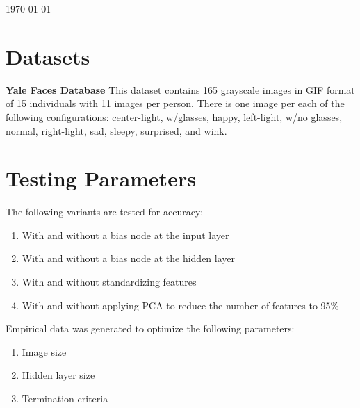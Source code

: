 \documentclass[12pt]{article}
\begin{document}
\begin{titlepage}

{\large \today}\\[3cm] %




\vfill %
\end{titlepage}

\newpage

\section{Datasets}
\textbf{Yale Faces Database} \quad This dataset contains 165 grayscale images in GIF format of 15 individuals with 11 images per person. There is one image per each of the following configurations: center-light, w/glasses, happy, left-light, w/no glasses, normal, right-light, sad, sleepy, surprised, and wink.

\section{Testing Parameters}
The following variants are tested for accuracy:
\begin{enumerate}
  \item With and without a bias node at the input layer
  \item With and without a bias node at the hidden layer
  \item With and without standardizing features
  \item With and without applying PCA to reduce the number of features to 95\%
\end{enumerate}
Empirical data was generated to optimize the following parameters:
\begin{enumerate}
  \item Image size
  \item Hidden layer size
  \item Termination criteria
\end{enumerate}
\end{document}
